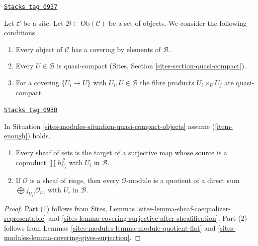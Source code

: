 \begin{definition}
\label{sites-modules-situation-quasi-compact-objects}
\href{https://stacks.math.columbia.edu/tag/0937}{\texttt{Stacks tag 0937}}

Let $\mathcal{C}$ be a site. Let
$\mathcal{B} \subset \text{Ob}(\mathcal{C})$ be a set
of objects. We consider the following conditions
\begin{enumerate}
\item
\label{sites-modules-item-enough}
Every object of $\mathcal{C}$ has a covering by elements of $\mathcal{B}$.
\item
\label{sites-modules-item-enough-qc}
Every $U \in \mathcal{B}$ is quasi-compact
(Sites, Section \ref{sites-section-quasi-compact}).
\item
\label{sites-modules-item-enough-qc-qs}
For a covering $\{U_i \to U\}$ with $U_i, U \in \mathcal{B}$
the fibre products $U_i \times_U U_j$ are quasi-compact.
\end{enumerate}
\end{definition}

\begin{lemma}
\label{sites-modules-lemma-module-quotient-direct-sum}
\href{https://stacks.math.columbia.edu/tag/093B}{\texttt{Stacks tag 093B}}

In Situation \ref{sites-modules-situation-quasi-compact-objects} assume
(\ref{item-enough}) holds.
\begin{enumerate}
\item Every sheaf of sets is the target of a surjective map
whose source is a coproduct $\coprod h_{U_i}^\#$ with $U_i$ in $\mathcal{B}$.
\item If $\mathcal{O}$ is a sheaf of rings, then every $\mathcal{O}$-module
is a quotient of a direct sum $\bigoplus\nolimits j_{U_i!}\mathcal{O}_{U_i}$
with $U_i$ in $\mathcal{B}$.
\end{enumerate}
\end{lemma}

\begin{proof}
Part (1) follows from Sites, Lemmas
\ref{sites-lemma-sheaf-coequalizer-representable} and
\ref{sites-lemma-covering-surjective-after-sheafification}.
Part (2) follows from Lemmas \ref{sites-modules-lemma-module-quotient-flat} and
\ref{sites-modules-lemma-covering-gives-surjection}.
\end{proof}


